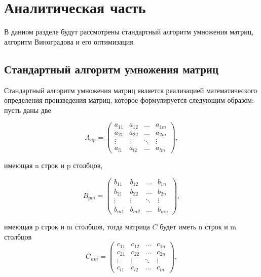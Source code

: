 \chapter{Аналитическая часть}

В данном разделе будут рассмотрены стандартный алгоритм 
умножения матриц, алгоритм Виноградова и его оптимизация.

\section{Стандартный алгоритм умножения матриц}

Стандартный алгоритм умножения матриц является реализацией математического определения
произведения матриц, которое формулируется следующим образом: пусть даны две 

\begin{equation}
    A_{np} = \begin{pmatrix}
            a_{11} & a_{12} & \ldots & a_{1m}\\
            a_{21} & a_{22} & \ldots & a_{2m}\\
            \vdots & \vdots & \ddots & \vdots\\
            a_{l1} & a_{l2} & \ldots & a_{lm}
    \end{pmatrix},
\end{equation}

имеющая n строк и p столбцов,

\begin{equation}
    B_{pm} = \begin{pmatrix}
            b_{11} & b_{12} & \ldots & b_{1n}\\
            b_{21} & b_{22} & \ldots & b_{2n}\\
            \vdots & \vdots & \ddots & \vdots\\
            b_{m1} & b_{m2} & \ldots & b_{mn}
        \end{pmatrix},
\end{equation}

имеющая p строк и m столбцов, тогда матрица $C$ будет иметь n строк и m столбцов
\begin{equation}
	C_{nm} = \begin{pmatrix}
		c_{11} & c_{12} & \ldots & c_{1n}\\
		c_{21} & c_{22} & \ldots & c_{2n}\\
		\vdots & \vdots & \ddots & \vdots\\
		c_{l1} & c_{l2} & \ldots & c_{ln}
	\end{pmatrix},
\end{equation}

